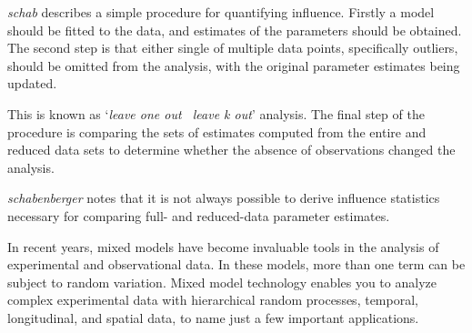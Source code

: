 \documentclass[Main.tex]{subfiles}
\begin{document}
		\emph{schab} describes a simple procedure for quantifying
		influence. Firstly a model should be fitted to the data, and
		estimates of the parameters should be obtained. The second step is
		that either single of multiple data points, specifically outliers,
		should be omitted from the analysis, with the original parameter
		estimates being updated. 
		
		This is known as `\textit{leave one out \ leave k
			out}' analysis. The final step of the procedure is comparing the
		sets of estimates computed from the entire and reduced data sets
		to determine whether the absence of observations changed the
		analysis.
		
		\textit{schabenberger} notes that it is not always possible to
		derive influence statistics necessary for comparing full- and
		reduced-data parameter estimates. 
		
		

		
		
		
		In recent years, mixed models have become invaluable tools in the analysis of experimental and observational
		data. In these models, more than one term can be subject to random variation. Mixed model
		technology enables you to analyze complex experimental data with hierarchical random processes, temporal,
		longitudinal, and spatial data, to name just a few important applications. 
		
\end{document}
